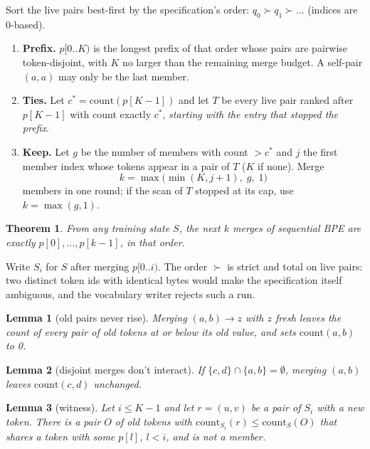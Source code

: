 \documentclass[11pt,a4paper]{article}
\newtheorem{theorem}{Theorem}
\newtheorem{lemma}{Lemma}
\begin{document}
Sort the live pairs best-first by the specification's order: $q_0 \succ q_1 \succ \dots$ (indices are 0-based).
\begin{enumerate}
\item \textbf{Prefix.} $p[0..K)$ is the longest prefix of that order whose pairs are pairwise token-disjoint, with $K$
  no larger than the remaining merge budget. A self-pair $(a,a)$ may only be the last member.
\item \textbf{Ties.} Let $c^* = \mathrm{count}(p[K{-}1])$ and let $T$ be every live pair ranked after $p[K{-}1]$ with
  count exactly $c^*$, \emph{starting with the entry that stopped the prefix}.
\item \textbf{Keep.} Let $g$ be the number of members with count $> c^*$ and $j$ the first member index whose tokens
  appear in a pair of $T$ ($K$ if none). Merge
  \[ k = \max\bigl(\min(K, j+1),\; g,\; 1\bigr) \]
  members in one round; if the scan of $T$ stopped at its cap, use $k=\max(g,1)$.
\end{enumerate}

\begin{theorem}
From any training state $S$, the next $k$ merges of sequential BPE are exactly $p[0], \dots, p[k{-}1]$, in that order.
\end{theorem}

Write $S_i$ for $S$ after merging $p[0..i)$. The order $\succ$ is strict and total on live pairs: two distinct token ids
with identical bytes would make the specification itself ambiguous, and the vocabulary writer rejects such a run.

\begin{lemma}[old pairs never rise]
Merging $(a,b)\to z$ with $z$ fresh leaves the count of every pair of old tokens at or below its old value, and sets
$\mathrm{count}(a,b)$ to 0.
\end{lemma}

\begin{lemma}[disjoint merges don't interact]
If $\{c,d\}\cap\{a,b\}=\emptyset$, merging $(a,b)$ leaves $\mathrm{count}(c,d)$ unchanged.
\end{lemma}

\begin{lemma}[witness]
Let $i \le K{-}1$ and let $r=(u,v)$ be a pair of $S_i$ with a new token. There is a pair $O$ of old tokens with
$\mathrm{count}_{S_i}(r) \le \mathrm{count}_S(O)$ that shares a token with some $p[l]$, $l<i$, and is not a member.
\end{lemma}
\end{document}
